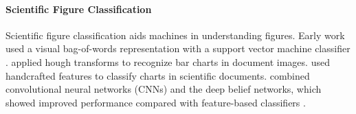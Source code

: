\documentclass{article}
\begin{document}
\paragraph{Scientific Figure Classification}
Scientific figure classification \cite{Savva2011ReVisionAC, Choudhury2015AnAF} aids machines in understanding figures. Early work used a visual bag-of-words representation with a support vector machine classifier \cite{Savva2011ReVisionAC}. \cite{Zhou2000HoughTF} applied hough transforms to recognize bar charts in document images. %
\cite {Siegel2016FigureSeerPR} used handcrafted features to classify charts in scientific documents. %
\cite{tange2016deepchart} combined convolutional neural networks (CNNs) and the deep belief networks, which showed improved performance compared with feature-based classifiers . 

\end{document}

